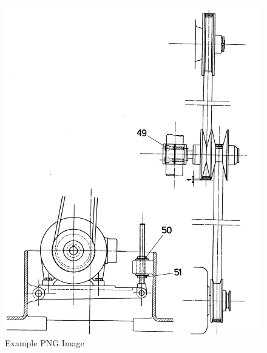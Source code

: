\newpage
\begin{figure}[h]
    \centering
    \includegraphics[width=1.0\linewidth]{images/page_25}
    \caption{Example PNG Image}
    \label{fig:belt_tensioning}
\end{figure}
